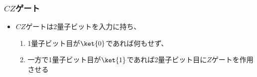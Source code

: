 \begin{frame}
  \frametitle{$CZ$ゲート}

  \pause
  \begin{itemize}
    \item $CZ$ゲートは2量子ビットを入力に持ち、
    \begin{enumerate}
      \item 1量子ビット目が$\ket{0}$であれば何もせず、
      \item 一方で1量子ビット目が$\ket{1}$であれば2量子ビット目に$Z$ゲートを作用させる
    \end{enumerate}
  \end{itemize}

  \pause

  \pause
\end{frame}

